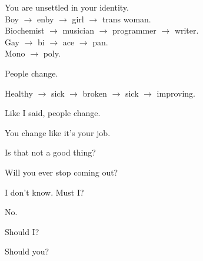 \begin{ally}
You are unsettled in your identity.\\
Boy $\rightarrow$ enby $\rightarrow$ girl $\rightarrow$ trans woman.\\
Biochemist $\rightarrow$ musician $\rightarrow$ programmer $\rightarrow$ writer.\\
Gay $\rightarrow$ bi $\rightarrow$ ace $\rightarrow$ pan.\\
Mono $\rightarrow$ poly.
\end{ally}
People change.

\begin{ally}
Healthy $\rightarrow$ sick $\rightarrow$ broken $\rightarrow$ sick $\rightarrow$ improving.
\end{ally}
Like I said, people change.

\begin{ally}
You change like it's your job.
\end{ally}
Is that not a good thing?

\begin{ally}
Will you ever stop coming out?
\end{ally}
I don't know. Must I?

\begin{ally}
No.
\end{ally}
Should I?

\begin{ally}
Should you?
\end{ally}
\newpage
